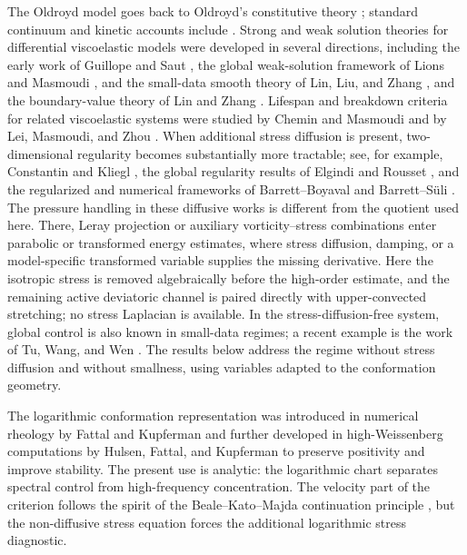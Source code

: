 \documentclass[11pt]{article}
\begin{document}
The Oldroyd model goes back to Oldroyd's constitutive theory
\cite{Oldroyd1950}; standard continuum and kinetic accounts include
\cite{Bird1987,BirdCurtiss1987,DoiEdwards1986,Larson1988,BerisEdwards1994,Renardy2000,OwensPhillips2002}.
Strong and weak solution theories for differential viscoelastic models were
developed in several directions, including the early work of Guillope and Saut
\cite{GuillopeSaut1990}, the global weak-solution framework of Lions and
Masmoudi \cite{LionsMasmoudi2000}, and the small-data smooth theory of Lin,
Liu, and Zhang \cite{LinLiuZhang2005}, and the boundary-value theory of Lin and
Zhang \cite{LinZhang2008}.  Lifespan and breakdown criteria for
related viscoelastic systems were studied by Chemin and Masmoudi
\cite{CheminMasmoudi2001} and by Lei, Masmoudi, and Zhou
\cite{LeiMasmoudiZhou2010}.  When additional stress diffusion is present,
two-dimensional regularity becomes substantially more tractable; see, for
example, Constantin and Kliegl \cite{ConstantinKliegl2012}, the global
regularity results of Elgindi and Rousset \cite{ElgindiRousset2015}, and the
regularized and numerical frameworks of Barrett--Boyaval and Barrett--S\"uli
\cite{BarrettBoyaval2011,BarrettSuli2007}.  The
pressure handling in these diffusive works is different from the quotient used
here.  There, Leray projection or auxiliary vorticity--stress combinations enter
parabolic or transformed energy estimates, where stress diffusion, damping, or a
model-specific transformed variable supplies the missing derivative.  Here the
isotropic stress is removed algebraically before the high-order estimate, and the
remaining active deviatoric channel is paired directly with upper-convected
stretching; no stress Laplacian is available.  In the stress-diffusion-free
system, global control is also known in small-data regimes; a recent example is
the work of Tu, Wang, and Wen \cite{TuWangWen2024}.  The results below address
the regime without stress diffusion and without smallness, using variables
adapted to the conformation geometry.

The logarithmic conformation representation was introduced in numerical
rheology by Fattal and Kupferman \cite{FattalKupferman2004,FattalKupferman2005}
and further developed in high-Weissenberg computations by Hulsen, Fattal, and
Kupferman \cite{HulsenFattalKupferman2005} to preserve positivity and improve
stability.  The
present use is analytic: the logarithmic chart separates spectral control from
high-frequency concentration.  The velocity part of the criterion follows the
spirit of the Beale--Kato--Majda continuation principle
\cite{BealeKatoMajda1984}, but the non-diffusive stress equation forces the
additional logarithmic stress diagnostic.
\end{document}
